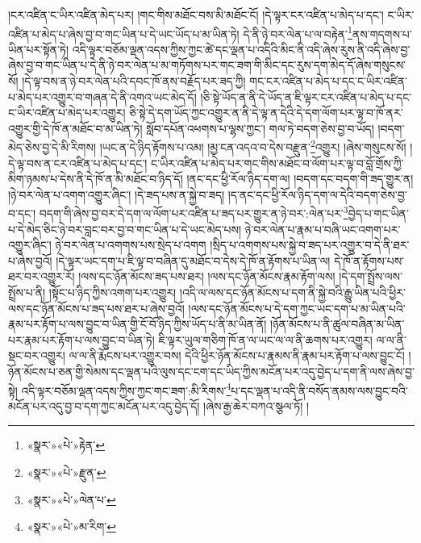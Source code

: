 །ངར་འཛིན་ང་ཡིར་འཛིན་མེད་པར། །གང་གིས་མཐོང་བས་མི་མཐོང་ངོ། །དེ་ལྟར་ངར་འཛིན་པ་མེད་པ་དང་། ང་ཡིར་འཛིན་པ་མེད་པ་ཞེས་བྱ་བ་གང་ཡིན་པ་དེ་ཡང་ཡོད་པ་མ་ཡིན་ཏེ། དེ་ནི་ཉེ་བར་ལེན་པ་ལ་བརྟེན་\footnote{«སྣར་»«པེ་»རྟེན་}ནས་གདགས་པ་ཡིན་པར་སྟོན་ཏེ། འདི་ལྟར་བཅོམ་ལྡན་འདས་ཀྱིས་ཀྱང་ཚེ་དང་ལྡན་པ་འདིའི་མིང་ནི་འདི་ཞེས་རུས་ནི་འདི་ཞེས་བྱ་ཞེས་བྱ་བ་གང་ཡིན་པ་དེ་ནི་ཉེ་བར་ལེན་པ་མ་གཏོགས་པར་གང་ཟག་གི་མིང་དང་རུས་དག་མེད་དོ་ཞེས་གསུངས་སོ། །དེ་ལྟ་བས་ན་ཉེ་བར་ལེན་པའི་དབང་ཁོ་ནས་བརྗོད་པར་ཟད་ཀྱི། གང་ངར་འཛིན་པ་མེད་པ་དང་ང་ཡིར་འཛིན་པ་མེད་པར་འགྱུར་བ་གཞན་དེ་ནི་འགའ་ཡང་མེད་དོ། །ཅི་སྟེ་ཡོད་ན་ནི་དེ་ཡོད་ན་ཇི་ལྟར་ངར་འཛིན་པ་མེད་པ་དང་ང་ཡིར་འཛིན་པ་མེད་པར་འགྱུར། ཅི་སྟེ་དེ་དག་ཡོད་ཀྱང་འགྱུར་ན་ནི་དེ་ལྟ་ན་དེའི་དེ་དག་ལོག་པར་ལྟ་བ་ཁོ་ནར་འགྱུར་གྱི་དེ་ཁོ་ན་མཐོང་བ་མ་ཡིན་ཏེ། སློབ་དཔོན་འཕགས་པ་ལྷས་ཀྱང་། གལ་ཏེ་བདག་ཅེས་བྱ་བ་ཡོད། །བདག་མེད་ཅེས་བྱ་དེ་མི་རིགས། །ཡང་ན་དེ་ཉིད་རྟོགས་པ་འམ། །མྱ་ངན་འདའ་བ་དེས་བརྫུན་\footnote{«སྣར་»«པེ་»རྫུན་}འགྱུར། །ཞེས་གསུངས་སོ། །དེ་ལྟ་བས་ན་ངར་འཛིན་པ་མེད་པ་དང་། ང་ཡིར་འཛིན་པ་མེད་པར་གང་གིས་མཐོང་བ་ལོག་པར་ལྟ་བ་བློ་གྲོས་ཀྱི་མིག་ཉམས་པ་དེས་ནི་དེ་ཁོ་ན་མི་མཐོང་བ་ཉིད་དོ། །ནང་དང་ཕྱི་རོལ་ཉིད་དག་ལ། །བདག་དང་བདག་གི་ཟད་གྱུར་ན། །ཉེ་བར་ལེན་པ་འགག་འགྱུར་ཞིང་། །དེ་ཟད་པས་ན་སྐྱེ་བ་ཟད། །ད་ནང་དང་ཕྱི་རོལ་ཉིད་དག་ལ་དེའི་བདག་ཅེས་བྱ་བ་དང་། བདག་གི་ཞེས་བྱ་བར་དེ་དག་ལ་ལོག་པར་འཛིན་པ་ཟད་པར་གྱུར་ན་ཉེ་བར་:ལེན་པར་\footnote{«སྣར་»«པེ་»ལེན་པ་}བྱེད་པ་གང་ཡིན་པ་དེ་མེད་ཅིང་ཉེ་བར་བླང་བར་བྱ་བ་གང་ཡིན་པ་དེ་ཡང་མེད་པས། ཉེ་བར་ལེན་པ་རྣམ་པ་བཞི་ཡང་འགག་པར་འགྱུར་ཞིང་། ཉེ་བར་ལེན་པ་འགགས་པས་སྲེད་པ་འགག །སྲིད་པ་འགགས་པས་སྐྱེ་བ་ཟད་པར་འགྱུར་བ་དེ་ནི་ཐར་པ་ཞེས་བྱའོ། །དེ་ལྟར་ཡང་དག་པ་ཇི་ལྟ་བ་བཞིན་དུ་མཐོང་བ་དེས་དེ་ཁོ་ན་རྟོགས་པ་ཡིན་ལ། དེ་ཁོ་ན་རྟོགས་པས་ཐར་བར་འགྱུར་རོ། །ལས་དང་ཉོན་མོངས་ཟད་པས་ཐར། །ལས་དང་ཉོན་མོངས་རྣམ་རྟོག་ལས། །དེ་དག་སྤྲོས་ལས་སྤྲོས་པ་ནི། །སྟོང་པ་ཉིད་ཀྱིས་འགག་པར་འགྱུར། །འདི་ལ་ལས་དང་ཉོན་མོངས་པ་དག་ནི་སྐྱེ་བའི་རྒྱུ་ཡིན་པའི་ཕྱིར་ལས་དང་ཉོན་མོངས་པ་ཟད་པས་ཐར་པ་ཞེས་བྱའོ། །ལས་དང་ཉོན་མོངས་པ་དེ་དག་ཀྱང་ཡང་དག་པ་མ་ཡིན་པའི་རྣམ་པར་རྟོག་པ་ལས་བྱུང་བ་ཡིན་གྱི་ངོ་བོ་ཉིད་ཀྱིས་ཡོད་པ་ནི་མ་ཡིན་ནོ། །ཉོན་མོངས་པ་ནི་ཚུལ་བཞིན་མ་ཡིན་པར་རྣམ་པར་རྟོག་པ་ལས་བྱུང་བ་ཡིན་ཏེ། ཇི་ལྟར་ཡུལ་གཅིག་ཁོ་ན་ལ་ཡང་ལ་ལ་ནི་ཆགས་པར་འགྱུར། ལ་ལ་ནི་སྡང་བར་འགྱུར། ལ་ལ་ནི་རྨོངས་པར་འགྱུར་བས། དེའི་ཕྱིར་ཉོན་མོངས་པ་རྣམས་ནི་རྣམ་པར་རྟོག་པ་ལས་བྱུང་ངོ། །ཉོན་མོངས་པ་ཅན་གྱི་སེམས་དང་ལྡན་པའི་ལུས་དང་ངག་དང་ཡིད་ཀྱིས་མངོན་པར་འདུ་བྱེད་པ་དག་ནི་ལས་ཞེས་བྱ་སྟེ། འདི་ལྟར་བཅོམ་ལྡན་འདས་ཀྱིས་ཀྱང་གང་ཟག་:མི་རིགས་\footnote{«སྣར་»«པེ་»མ་རིག་}པ་དང་ལྡན་པ་འདི་ནི་བསོད་ནམས་ལས་བྱུང་བའི་མངོན་པར་འདུ་བྱ་བ་དག་ཀྱང་མངོན་པར་འདུ་བྱེད་དོ། །ཞེས་རྒྱ་ཆེར་བཀའ་སྩལ་ཏོ། །
